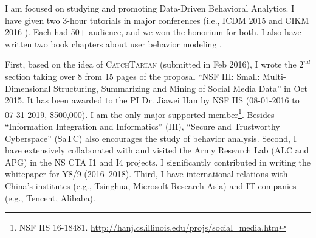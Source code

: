 \documentclass[10.5pt]{article}
\begin{document}
\vskip 0.02in
 I am focused on studying and promoting Data-Driven Behavioral Analytics. I have given two 3-hour tutorials in major conferences (i.e., ICDM 2015 \cite{jiang2015behavior} and CIKM 2016 \cite{jiang2016data}). Each had 50+ audience, and we won the honorium for both. I also have written two book chapters about user behavior modeling \cite{jiang2016mining,jiang2016behavior}.

\vskip 0.02in
 First, based on the idea of \textsc{CatchTartan} \cite{jiang2016catchtartan} (submitted in Feb 2016), I wrote the $2^{nd}$ section taking over 8 from 15 pages of the proposal ``NSF III: Small: Multi-Dimensional Structuring, Summarizing and Mining of Social Media Data'' in Oct 2015. It has been awarded to the PI Dr. Jiawei Han by NSF IIS (08-01-2016 to 07-31-2019, \$500,000). I am the only major supported member\footnote{NSF IIS 16-18481. \url{http://hanj.cs.illinois.edu/projs/social\_media.htm}}. Besides ``Information Integration and Informatics'' (III), ``Secure and Trustworthy Cyberspace'' (SaTC) also encourages the study of behavior analysis. Second, I have extensively collaborated with and visited the Army Research Lab (ALC and APG) in the NS CTA I1 and I4 projects. I significantly contributed in writing the whitepaper for Y8/9 (2016--2018). Third, I have international relations with China's institutes (e.g., Tsinghua, Microsoft Research Asia) and IT companies (e.g., Tencent, Alibaba).

\vspace{-0.20in}
\small{
\begin{footnotesize}


\end{footnotesize}
}
\end{document}
